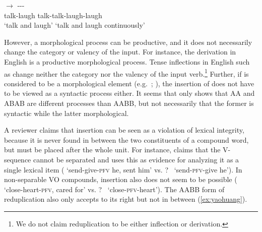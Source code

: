   \ex \gll {} $\rightarrow$ ---\\
  talk-laugh {} talk-talk-laugh-laugh\\ 
  \glt `talk and laugh' `talk and laugh continuously'
  \z
\z

However, a morphological process can be productive, and it does not necessarily change the category or valency of the input.
For instance, the  derivation in English is a productive morphological process.
Tense inflections in English such as  change neither the category nor the valency of the input verb.\footnote{
We do not claim reduplication to be either inflection or derivation.
}
Further, if  is considered to be a morphological element (e.g.\ \citealt[101--102]{Huangetal2009}; \citealt[246]{MuellerLipenkova2013}), the insertion of  does not have to be viewed as a syntactic
process either.
It seems that \citet{Xie2020} only shows that AA and ABAB are different processes than AABB, but not necessarily that the former is syntactic while the latter morphological.

A reviewer claims that  insertion can be seen as a violation of lexical integrity,
because it is never found in between the two constituents of a compound word,
but must be placed after the whole unit.
For instance, \citet[1282]{Her2006} claims that the V- sequence cannot be separated 
and uses this as evidence for analyzing it as a single lexical item 
(  `send-give-\textsc{pfv} he, sent him' vs. ?\   `send-\textsc{pfv}-give he').
In non-separable VO compounds,  insertion also does not seem to be possible 
( `close-heart-\textsc{pfv}, cared for' vs. ?\  `close-\textsc{pfv}-heart').
The AABB form of reduplication also only accepts  to its right but not in between (\ref{ex:yaohuang}).
\ea\label{ex:yaohuang} %

